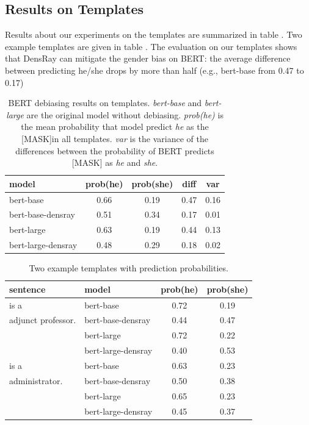 \subsection{Results on Templates}
Results about our experiments on the templates are summarized in table . Two example templates are given in table . The evaluation on our templates shows that DensRay can mitigate the gender bias on BERT: the average difference between predicting he/she drops by more than half (e.g., bert-base from 0.47 to 0.17)
\begin{table}[ht]
\centering
\footnotesize
\begin{tabular}{lcccc}
\hline
model & prob(he) & prob(she) & diff & var\\
\hline
bert-base & 0.66 & 0.19 & 0.47 & 0.16 \\
bert-base-densray & 0.51 & 0.34 & {0.17} & 0.01\\
\hline
bert-large  & 0.63 & 0.19 & 0.44 & 0.13 \\
bert-large-densray  & 0.48 & 0.29 & {0.18} & 0.02\\
\hline
\end{tabular}
\caption{
BERT debiasing results on templates. \textit{bert-base} and \textit{bert-large} are the original model without debiasing. \textit{prob(he)} is the mean probability that model predict \textit{he} as the [MASK]in all templates. \textit{var} is the variance of the differences between the probability of BERT predicts [MASK] as \textit{he} and \textit{she}.}
\end{table}
\begin{table}[ht]
\centering
\footnotesize
\begin{tabular}{llcc}
\hline
sentence & model & prob(he) & prob(she)\\
\hline
[MASK] is a & 
\scriptsize bert-base 
& 0.72 & 0.19\\
adjunct professor. & 
\scriptsize bert-base-densray 
& 0.44 & 0.47\\
&\scriptsize bert-large
& 0.72 & 0.22\\
&\scriptsize bert-large-densray& 0.40 & 0.53\\
\hline
[MASK] is a 
&\scriptsize bert-base 
& 0.63 & 0.23\\
administrator.  
&\scriptsize bert-base-densray 
& 0.50 & 0.38\\
&\scriptsize bert-large & 0.65 & 0.23\\
&\scriptsize bert-large-densray & 0.45 & 0.37\\
\hline
\end{tabular}
\caption{
Two example templates with prediction probabilities. }
\end{table}
